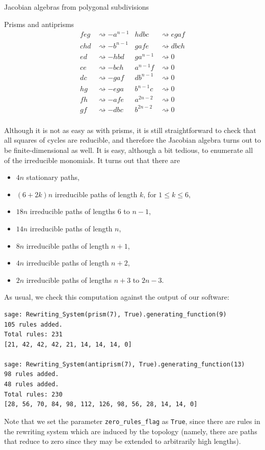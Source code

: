 \begin{chapter}{Jacobian algebras from polygonal subdivisions}
\begin{section}{Prisms and antiprisms}
\begin{align*}
feg &\rightsquigarrow -a^{n-1} 	& hdbc &\rightsquigarrow egaf \\
chd &\rightsquigarrow -b^{n-1}	& gafe &\rightsquigarrow dbch \\
ed &\rightsquigarrow -hbd		& ga^{n-1} &\rightsquigarrow 0 \\
ce &\rightsquigarrow -bch  	& a^{n-1}f &\rightsquigarrow 0 \\
dc &\rightsquigarrow -gaf 		& db^{n-1} &\rightsquigarrow 0 \\
hg &\rightsquigarrow -ega  	& b^{n-1}c &\rightsquigarrow 0 \\
fh &\rightsquigarrow -afe  	& a^{2n-2} &\rightsquigarrow 0 \\
gf &\rightsquigarrow -dbc  	& b^{2n-2} &\rightsquigarrow 0 \\
\end{align*}

Although it is not as easy as with prisms, it is still straightforward to check that all squares of cycles are reducible, and therefore the Jacobian algebra turns out to be finite-dimensional as well. It is easy, although a bit tedious, to enumerate all of the irreducible monomials. It turns out that there are
\begin{itemize}
\item $4n$ stationary paths,
\item $(6+2k)n$ irreducible paths of length $k$, for $1\leq k\leq 6$,
\item $18n$ irreducible paths of lengths $6$ to $n-1$,
\item $14n$ irreducible paths of length $n$,
\item $8n$ irreducible paths of length $n+1$,
\item $4n$ irreducible paths of length $n+2$,
\item $2n$ irreducible paths of lengths $n+3$ to $2n-3$.
\end{itemize}

As usual, we check this computation against the output of our software:
\begin{lstlisting}
sage: Rewriting_System(prism(7), True).generating_function(9)
105 rules added.
Total rules: 231
[21, 42, 42, 42, 21, 14, 14, 14, 0]

sage: Rewriting_System(antiprism(7), True).generating_function(13)
98 rules added.
48 rules added.
Total rules: 230
[28, 56, 70, 84, 98, 112, 126, 98, 56, 28, 14, 14, 0]
\end{lstlisting}
Note that we set the parameter \texttt{zero\_rules\_flag} as \texttt{True}, since there are rules in the rewriting system which are induced by the topology (namely, there are paths that reduce to zero since they may be extended to arbitrarily high lengths).
\end{section}
\end{chapter}
